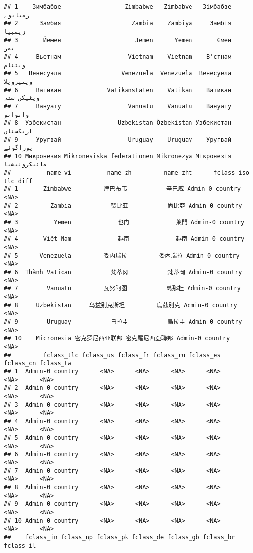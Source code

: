 \documentclass[
]{article}
\begin{document}
\begin{verbatim}
## 1    Зимбабве                  Zimbabwe   Zimbabve   Зімбабве      زمبابوے
## 2      Замбия                    Zambia    Zambiya     Замбія       زیمبیا
## 3       Йемен                     Jemen      Yemen       Ємен          یمن
## 4     Вьетнам                   Vietnam    Vietnam    В'єтнам       ویتنام
## 5   Венесуэла                 Venezuela  Venezuela  Венесуела    وینیزویلا
## 6     Ватикан             Vatikanstaten    Vatikan    Ватикан   ویٹیکن سٹی
## 7     Вануату                   Vanuatu    Vanuatu    Вануату      وانواتو
## 8  Узбекистан                Uzbekistan Özbekistan Узбекистан     ازبکستان
## 9     Уругвай                   Uruguay    Uruguay    Уругвай     یوراگوئے
## 10 Микронезия Mikronesiska federationen Mikronezya Мікронезія مائیکرونیشیا
##          name_vi          name_zh         name_zht      fclass_iso tlc_diff
## 1       Zimbabwe         津巴布韦           辛巴威 Admin-0 country     <NA>
## 2         Zambia           赞比亚           尚比亞 Admin-0 country     <NA>
## 3          Yemen             也门             葉門 Admin-0 country     <NA>
## 4       Việt Nam             越南             越南 Admin-0 country     <NA>
## 5      Venezuela         委内瑞拉         委內瑞拉 Admin-0 country     <NA>
## 6  Thành Vatican           梵蒂冈           梵蒂岡 Admin-0 country     <NA>
## 7        Vanuatu         瓦努阿图           萬那杜 Admin-0 country     <NA>
## 8     Uzbekistan     乌兹别克斯坦         烏茲別克 Admin-0 country     <NA>
## 9        Uruguay           乌拉圭           烏拉圭 Admin-0 country     <NA>
## 10    Micronesia 密克罗尼西亚联邦 密克羅尼西亞聯邦 Admin-0 country     <NA>
##         fclass_tlc fclass_us fclass_fr fclass_ru fclass_es fclass_cn fclass_tw
## 1  Admin-0 country      <NA>      <NA>      <NA>      <NA>      <NA>      <NA>
## 2  Admin-0 country      <NA>      <NA>      <NA>      <NA>      <NA>      <NA>
## 3  Admin-0 country      <NA>      <NA>      <NA>      <NA>      <NA>      <NA>
## 4  Admin-0 country      <NA>      <NA>      <NA>      <NA>      <NA>      <NA>
## 5  Admin-0 country      <NA>      <NA>      <NA>      <NA>      <NA>      <NA>
## 6  Admin-0 country      <NA>      <NA>      <NA>      <NA>      <NA>      <NA>
## 7  Admin-0 country      <NA>      <NA>      <NA>      <NA>      <NA>      <NA>
## 8  Admin-0 country      <NA>      <NA>      <NA>      <NA>      <NA>      <NA>
## 9  Admin-0 country      <NA>      <NA>      <NA>      <NA>      <NA>      <NA>
## 10 Admin-0 country      <NA>      <NA>      <NA>      <NA>      <NA>      <NA>
##    fclass_in fclass_np fclass_pk fclass_de fclass_gb fclass_br fclass_il

\end{verbatim}
\end{document}
